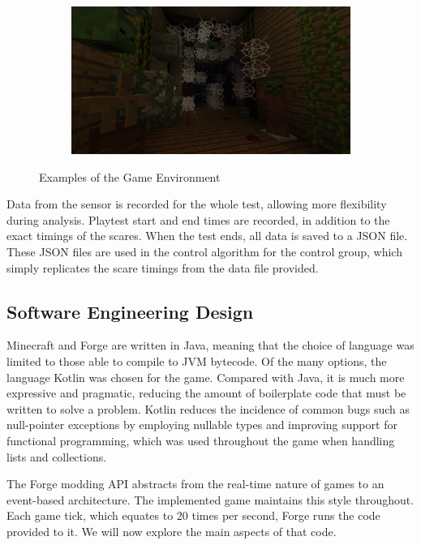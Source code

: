 \documentclass[12pt,a4paper]{article}\usepackage[]{graphicx}\usepackage[]{color}
\begin{document}
\begin{figure}[htb]
\begin{subfigure}[t]{.495\linewidth}
	\end{subfigure}
	\begin{subfigure}[t]{.495\linewidth}
		\centering
		\includegraphics[width=\textwidth]{images/environment4.png}
	\end{subfigure}
	\caption{Examples of the Game Environment}
	\label{fig:GameEnvironment}
\end{figure}


Data from the sensor is recorded for the whole test, allowing more flexibility during analysis.
Playtest start and end times are recorded, in addition to the exact timings of the scares.
When the test ends, all data is saved to a JSON file.
These JSON files are used in the control algorithm for the control group, which simply replicates the scare timings from the data file provided.

\subsection{Software Engineering Design}
Minecraft and Forge are written in Java, meaning that the choice of language was limited to those able to compile to JVM bytecode.
Of the many options, the language Kotlin was chosen for the game.
Compared with Java, it is much more expressive and pragmatic, reducing the amount of boilerplate code that must be written to solve a problem.
Kotlin reduces the incidence of common bugs such as null-pointer exceptions by employing nullable types and improving support for functional programming, which was used throughout the game when handling lists and collections.

The Forge modding API abstracts from the real-time nature of games to an event-based architecture.
The implemented game maintains this style throughout.
Each game tick, which equates to 20 times per second, Forge runs the code provided to it.
We will now explore the main aspects of that code.
\end{document}
